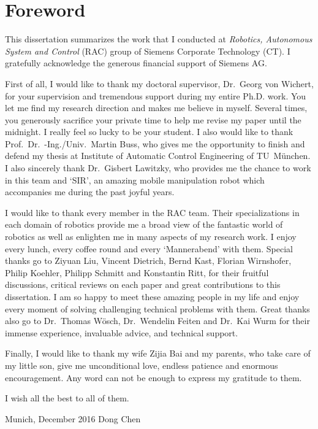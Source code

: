 \chapter*{Foreword}
This dissertation summarizes the work that I conducted at \textit{Robotics, Autonomous System and Control} (RAC) group of Siemens Corporate Technology (CT). I gratefully acknowledge the generous financial support of Siemens AG.

First of all, I would like to thank my doctoral supervisor, Dr.~Georg von Wichert, for your supervision and tremendous support during my entire Ph.D. work. You let me find my research direction and makes me believe in myself. Several times, you generously sacrifice your private time to help me revise my paper until the midnight. I really feel so lucky to be your student. I also would like to thank Prof.~Dr.~-Ing./Univ.~Martin Buss, who gives me the opportunity to finish and defend my thesis at Institute of Automatic
 Control Engineering of TU~M\"unchen. I also sincerely thank Dr.~Gisbert Lawitzky, who provides me the chance to work in this team and `SIR', an amazing mobile manipulation robot which accompanies me during the past joyful years. 

I would like to thank every member in the RAC team. Their specializations in each domain of robotics provide me a broad view of the fantastic world of robotics as well as enlighten me in many aspects of my research work. I enjoy every lunch, every coffee round and every `Mannerabend' with them. Special thanks go to  Ziyuan Liu, Vincent Dietrich, Bernd Kast, Florian Wirnshofer, Philip Koehler, Philipp Schmitt and Konstantin Ritt, for their fruitful discussions, critical reviews on each paper and great contributions to this dissertation. I am so happy to meet these amazing people in my life and enjoy every moment of solving challenging technical problems with them. Great thanks also go to Dr.~Thomas W\"osch, Dr.~Wendelin Feiten and Dr.~Kai Wurm for their immense experience, invaluable advice, and technical support. 

Finally, I would like to thank my wife Zijia Bai and my parents, who take care of my little son, give me unconditional love, endless patience and enormous encouragement. Any word can not be enough to express my gratitude to them.

I wish all the best to all of them.    

\vspace{1cm}
\noindent
Munich, December 2016 \hfill Dong Chen

